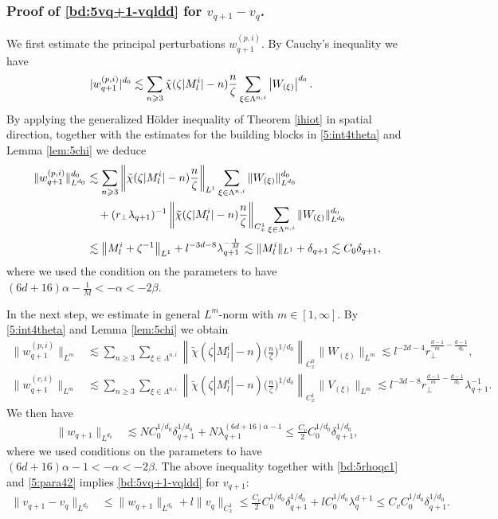 \documentclass[10pt,a4paper]{amsart}
\numberwithin{equation}{section}
\def\({{\Big(}}
\def\){{\Big)}}
\newcommand{\norm}[1]{\left\|#1\right\|}
\def\geq{\geqslant}
\def\leq{\leqslant}
\def\({{\Big(}}
\def\){{\Big)}}
\def\geq{\geqslant}
\def\leq{\leqslant}
\begin{document}
\subsubsection{Proof of  \eqref{bd:5vq+1-vqldd}  for $v_{q+1}-v_q$.}
We first estimate the principal perturbations ${w}^{(p,i)}_{q+1}$. By Cauchy's inequality  we have
\begin{align}
|w_{q+1}^{(p,i)}|^{d_0}  
&\lesssim \sum_{n\geq3}\tilde{\chi}(\zeta |M^i_l|-n)\frac{n}{\zeta }\sum_{\xi\in\Lambda^{n,i}}\left|W_{ (\xi)}\right|^{d_0}.\notag
\end{align} 
By applying the generalized H\"older inequality of 
Theorem \ref{ihiot} in spatial direction, together with the estimates for the building blocks in \eqref{5:int4theta} and Lemma \ref{lem:5chi} we deduce 
\begin{align}
\|w_{q+1}^{(p,i)}\|^{d_0}_{L^{d_0}} 
&\lesssim\sum_{n\geq3}\norm{\tilde{\chi}(\zeta |M^i_l |-n)\frac{n}{\zeta }}_{L^1}\sum_{\xi\in\Lambda^{n,i}}\|W_{ (\xi)}\|_{L^{d_0}}^{d_0}\notag\\ 
&\quad+(r_\perp\lambda_{q+1})^{-1}\norm{\tilde{\chi}(\zeta |M^i_l |-n)\frac{n}{\zeta }}_ {C_{x}^1}\sum_{\xi\in\Lambda^{n,i}}\|W_{ (\xi)}\|_{L^{d_0}}^{d_0} \notag\\
&\lesssim\norm{ M^i_l +\zeta ^{-1}}_{L^1}+l^{-3d-8}\lambda_{q+1}^{-\frac{1}{M}} \lesssim \|M^i_l \|_{L^1}+ \delta_{q+1}\lesssim C_0 \delta_{q+1}
,\notag
\end{align}
where we used  the condition on the parameters to have $(6d+16)\alpha-\frac{1}{M}<-\alpha<-2\beta$. 

In the next step, we estimate in  general $L^m$-norm with $m\in[1,\infty]$. By  \eqref{5:int4theta}   and   Lemma \ref{lem:5chi} we obtain
\begin{align}
\|w_{q+1}^{(p,i)}\|_{L^m}&\lesssim\sum_{n\geq3}\sum_{\xi\in\Lambda^{n,i}}\norm{\tilde{\chi}(\zeta |M^i_l|-n)\(\frac{n}{\zeta }\)^{1/d_0}}_ {C_{x}^0}\|W_{ (\xi)}\|_{L^m}\lesssim l^{-2d-4}r_\perp^{\frac{d-1}{m}-\frac{d-1}{d_0}} ,\label{bd:5wq+1plp}\\
\|w_{q+1}^{(c,i)}\|_{L^m}&\lesssim\sum_{n\geq3}\sum_{\xi\in\Lambda^{n,i}}\norm{\tilde{\chi}(\zeta |M^i_l|-n)\(\frac{n}{\zeta }\)^{1/d_0}}_{C^1_{x}}\|V_{ (\xi)}\|_{L^m}\lesssim l^{-3d-8}r_\perp^{\frac{d-1}{m}-\frac{d-1}{d_0}}\lambda_{q+1}^{-1}.\label{bd:5wq+1clp}
\end{align}
 We then have
\begin{align}
\|w_{q+1}\|_{L^{d_0}}%
&\lesssim NC_0^{1/d_0} \delta_{q+1}^{1/d_0}+N\lambda_{q+1}^{(6d+16)\alpha-1} \leq \frac{C_v}2C_0^{1/d_0}\delta_{q+1}^{1/d_0},\label{bd:5wq+1l2}\end{align}
where we used  conditions on the parameters to have
$(6d+16)\alpha-1<-\alpha<-2\beta$. 
The above inequality together with  \eqref{bd:5rhoqc1} and \eqref{5:para42} implies \eqref{bd:5vq+1-vqldd} for $v_{q+1}$:
\begin{align*}
\|v_{q+1}-v_{q}\|_{L^{d_0}}&\leq \|w_{q+1}\|_{L^{d_0}}+l\|v_{q}\|_ {C_{x}^1}
\leq \frac{ {C}_v}2C_0^{1/d_0}\delta_{q+1}^{1/d_0}+lC_0^{1/d_0}\lambda_{q}^{ d+1}\leq C_vC_0^{1/d_0}\delta_{q+1}^{1/d_0}.
\end{align*} 
\end{document}

